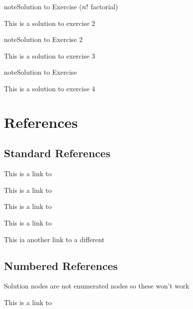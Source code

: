 \begin{sphinxadmonition}{note}{Solution to Exercise (\protect\(n!\protect\) factorial)}



\sphinxAtStartPar
This is a solution to exercise 2
\end{sphinxadmonition}
 \label{solution:solution-3}

\begin{sphinxadmonition}{note}{Solution to Exercise 2}



\sphinxAtStartPar
This is a solution to exercise 3
\end{sphinxadmonition}
 \label{solution:solution-4}

\begin{sphinxadmonition}{note}{Solution to Exercise}



\sphinxAtStartPar
This is a solution to exercise 4
\end{sphinxadmonition}


\section{References}
\label{\detokenize{solution:references}}

\subsection{Standard References}
\label{\detokenize{solution:standard-references}}
\sphinxAtStartPar
This is a link to {\hyperref[\detokenize{solution:solution-1}]{}}

\sphinxAtStartPar
This is a link to {\hyperref[\detokenize{solution:solution-2}]{}}

\sphinxAtStartPar
This is a link to {\hyperref[\detokenize{solution:solution-3}]{}}

\sphinxAtStartPar
This is a link to {\hyperref[\detokenize{solution:solution-4}]{}}

\sphinxAtStartPar
This ia another link to a different {\hyperref[\detokenize{solution:solution-1}]{}}


\subsection{Numbered References}
\label{\detokenize{solution:numbered-references}}
\sphinxAtStartPar
Solution nodes are not enumerated nodes so these won’t work

\sphinxAtStartPar
This is a link to 



\renewcommand{\indexname}{Index}
\printindex

